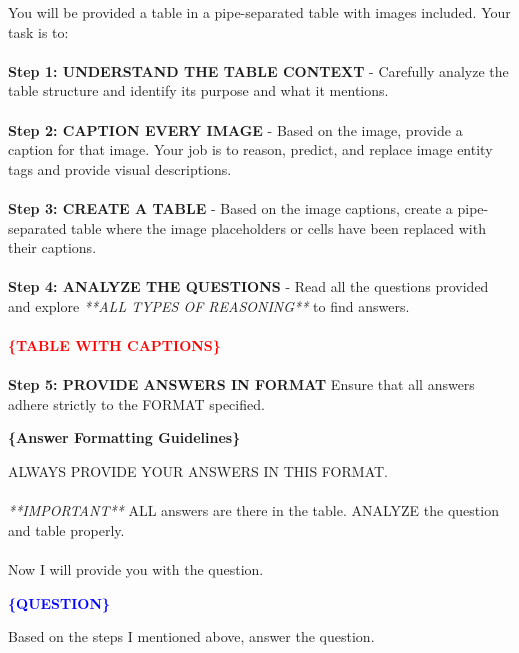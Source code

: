 \documentclass[11pt]{article}
\newcommand{\varred}[1]{\textcolor{red}{\textbf{#1}}}
\newcommand{\varblue}[1]{\textcolor{blue}{\textbf{#1}}}
\newcommand{\vargreen}[1]{\textcolor{olivegreen}{\textbf{#1}}}
\begin{document}
\begin{tcolorbox}[breakable,colback=lightestgray,colframe=black,title=\centering\textbf{Image Captioning Baseline Prompt}]

You will be provided a table in a pipe-separated table with images included. Your task is to:\\\\

\textbf{Step 1: UNDERSTAND THE TABLE CONTEXT} -
Carefully analyze the table structure and identify its purpose and what it mentions.\\\\

\textbf{Step 2: CAPTION EVERY IMAGE} -
Based on the image, provide a caption for that image. Your job is to reason, predict, and replace image entity tags and provide visual descriptions.\\\\

\textbf{Step 3: CREATE A TABLE} -
Based on the image captions, create a pipe-separated table where the image placeholders or cells have been replaced with their captions.\\\\

\textbf{Step 4: ANALYZE THE QUESTIONS} -
Read all the questions provided and explore \textit{**ALL TYPES OF REASONING**} to find answers.\\\\

\textbf{\varred{\{TABLE WITH CAPTIONS\}}}\\\\

\textbf{Step 5: PROVIDE ANSWERS IN FORMAT}
Ensure that all answers adhere strictly to the FORMAT specified.

\textbf{\vargreen{\{Answer Formatting Guidelines\}}}

ALWAYS PROVIDE YOUR ANSWERS IN THIS FORMAT.\\\\

\textit{**IMPORTANT**} ALL answers are there in the table. ANALYZE the question and table properly.\\\\

Now I will provide you with the question.

\textbf{\varblue{\{QUESTION\}}}

Based on the steps I mentioned above, answer the question.
\end{tcolorbox}
\end{document}
